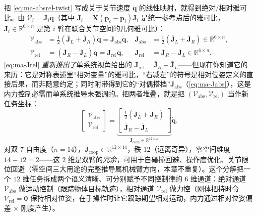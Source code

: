 把 \cref{eq:ma-absrel-twist} 写成关于关节速度 $\dot{\mathbf{q}}$ 的线性映射，就得到绝对/相对雅可比。由 $\bar{\boldsymbol{\mathcal{V}}}_i=\bar{\mathbf{J}}_i\dot{\mathbf{q}}$（其中 $\bar{\mathbf{J}}_i=\mathbf{X}(\mathbf{p}_c-\mathbf{p}_i)\mathbf{J}_i$ 是统一参考点后的雅可比，$\mathbf{J}_i\in\mathbb{R}^{6\times n}$ 是第 $i$ 臂在联合关节空间的几何雅可比）：
\begin{align}
  \boldsymbol{\mathcal{V}}_{\text{abs}}&=\tfrac12(\bar{\mathbf{J}}_L+\bar{\mathbf{J}}_R)\dot{\mathbf{q}}=\mathbf{J}_{\text{abs}}\dot{\mathbf{q}},
  & \mathbf{J}_{\text{abs}}&=\tfrac12(\bar{\mathbf{J}}_L+\bar{\mathbf{J}}_R)\in\mathbb{R}^{6\times n},
  \label{eq:ma-Jabs}\\
  \boldsymbol{\mathcal{V}}_{\text{rel}}&=(\bar{\mathbf{J}}_R-\bar{\mathbf{J}}_L)\dot{\mathbf{q}}=\mathbf{J}_{\text{rel}}\dot{\mathbf{q}},
  & \mathbf{J}_{\text{rel}}&=\bar{\mathbf{J}}_R-\bar{\mathbf{J}}_L\in\mathbb{R}^{6\times n}.
  \label{eq:ma-Jrel}
\end{align}
\cref{eq:ma-Jrel} \emph{重新推出了}单系统视角给出的 $\mathbf{J}_{\text{rel}}=\bar{\mathbf{J}}_R-\bar{\mathbf{J}}_L$——但现在你知道它的来历：它是对称表述里“相对变量”的雅可比，“右减左”的符号是相对位姿定义的直接后果，而非随意约定；同时附带得到它的“对偶搭档”$\mathbf{J}_{\text{abs}}$（\cref{eq:ma-Jabs}），这是内力控制必需而单系统推导未强调的。把两者堆叠，就是把 $(\boldsymbol{\mathcal{V}}_{\text{abs}},\boldsymbol{\mathcal{V}}_{\text{rel}})$ 当作新任务坐标：
\begin{equation}
  \begin{bmatrix}\boldsymbol{\mathcal{V}}_{\text{abs}}\\ \boldsymbol{\mathcal{V}}_{\text{rel}}\end{bmatrix}
  =\underbrace{\begin{bmatrix}\tfrac12(\bar{\mathbf{J}}_L+\bar{\mathbf{J}}_R)\\ \bar{\mathbf{J}}_R-\bar{\mathbf{J}}_L\end{bmatrix}}_{\mathbf{J}_{\text{coop}}\in\mathbb{R}^{12\times n}}\dot{\mathbf{q}}.
  \label{eq:ma-Jcoop}
\end{equation}
对双 $7$ 自由度（$n=14$），$\mathbf{J}_{\text{coop}}\in\mathbb{R}^{12\times 14}$，秩 $12$（远离奇异），零空间维度 $14-12=2$——这 $2$ 维是双臂的\emph{冗余}，可用于自碰撞回避、操作度优化、关节限位回避（零空间三大用途的完整推导属机械臂方向，本章不重复）。这个分解把一个 $12$ 维任务拆成两个语义清晰、可分别赋予不同控制律的 $6$ 维通道：绝对通道 $\boldsymbol{\mathcal{V}}_{\text{abs}}$ 做运动控制（跟踪物体目标轨迹），相对通道 $\boldsymbol{\mathcal{V}}_{\text{rel}}$ 做力控（刚体把持时令 $\boldsymbol{\mathcal{V}}_{\text{rel}}=\mathbf{0}$ 保持相对位姿，在手操作时让它跟踪期望相对运动，内力通过相对位姿偏差 $\times$ 刚度产生）。

